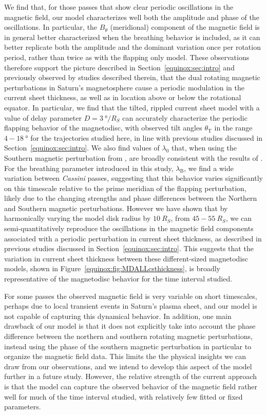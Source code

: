 We find that, for those passes that show clear periodic oscillations in the magnetic field, our model characterizes well both the amplitude and phase of the oscillations. In particular, the $B_\theta$ (meridional) component of the magnetic field is in general better characterized when the breathing behavior is included, as it can better replicate both the amplitude and the dominant variation once per rotation period, rather than twice as with the flapping only model. These observations therefore support the picture described in Section~\ref{equinox:sec:intro} and previously observed by studies described therein, that the dual rotating magnetic perturbations in Saturn's magnetosphere cause a periodic modulation in the current sheet thickness, as well as in location above or below the rotational equator. In particular, we find that the \citet{arridge2011} tilted, rippled current sheet model with a value of delay parameter $D = \SI{3}{\degree/R_S}$ can accurately characterize the periodic flapping behavior of the magnetodisc, with observed tilt angles $\theta_\mathrm{T}$ in the range $4-\SI{18}{\degree}$ for the trajectories studied here, in line with previous studies discussed in Section~\ref{equinox:sec:intro}. We also find values of $\lambda_0$ that, when using the Southern magnetic perturbation from \citet{andrews2012}, are broadly consistent with the results of \citet{arridge2011}. For the breathing parameter introduced in this study, $\lambda_\mathrm{B}$, we find a wide variation between \textit{Cassini }passes, suggesting that this behavior varies significantly on this timescale relative to the prime meridian of the flapping perturbation, likely due to the changing strengths and phase differences between the Northern and Southern magnetic perturbations. However we have shown that by harmonically varying the model disk radius by $\SI{10}{R_S}$, from $45-\SI{55}{R_S}$, we can semi-quantitatively reproduce the oscillations in the magnetic field components associated with a periodic perturbation in current sheet thickness, as described in previous studies discussed in Section~\ref{equinox:sec:intro}. This suggests that the variation in current sheet thickness between these different-sized magnetodisc models, shown in Figure~\ref{equinox:fig:MDALLcsthickness}, is broadly representative of the magnetodisc behavior for the time interval studied.

For some passes the observed magnetic field is very variable on short timescales, perhaps due to local transient events in Saturn's plasma sheet, and our model is not capable of capturing this dynamical behavior. In addition, one main drawback of our model is that it does not explicitly take into account the phase difference between the northern and southern rotating magnetic perturbations, instead using the phase of the southern magnetic perturbation in particular to organize the magnetic field data. This limits the the physical insights we can draw from our observations, and we intend to develop this aspect of the model further in a future study. However, the relative strength of the current approach is that the model can capture the observed behavior of the magnetic field rather well for much of the time interval studied, with relatively few fitted or fixed parameters.

